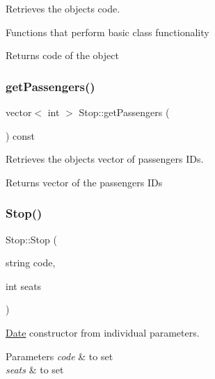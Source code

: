 Retrieves the object\textquotesingle{}s code. 

Functions that perform basic class functionality \begin{DoxyReturn}{Returns}
code of the object 
\end{DoxyReturn}
\mbox{\label{group___stop_gabd197ec53b1215bed050d879d463e987}} 
\subsubsection{\texorpdfstring{get\+Passengers()}{getPassengers()}}
{\footnotesize\ttfamily vector$<$ int $>$ Stop\+::get\+Passengers (\begin{DoxyParamCaption}{ }\end{DoxyParamCaption}) const}



Retrieves the object\textquotesingle{}s vector of passengers I\+Ds. 

\begin{DoxyReturn}{Returns}
vector of the passengers I\+Ds 
\end{DoxyReturn}
\mbox{\label{group___stop_gaa89c250884ae1407ac8647a8a3a58995}} 
\subsubsection{\texorpdfstring{Stop()}{Stop()}\hspace{0.1cm}{\footnotesize\ttfamily [1/2]}}
{\footnotesize\ttfamily Stop\+::\+Stop (\begin{DoxyParamCaption}\item[{string}]{code,  }\item[{int}]{seats }\end{DoxyParamCaption})}



\hyperlink{class_date}{Date} constructor from individual parameters. 


\begin{DoxyParams}{Parameters}
{\em code} & to set \\
\hline
{\em seats} & to set \\
\hline
\end{DoxyParams}
\mbox{\label{group___stop_ga843a7424de0129e7f6f066d2f8f1d1bc}} 

